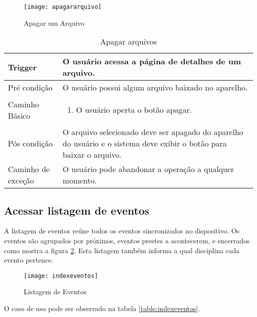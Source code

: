 \begin{figure}[H]
    \centering
\texttt{[image: apagararquivo]}
    \caption{Apagar um Arquivo}
    \label{apagararquivo}
\end{figure}


\begin{table}[H]
  \begin{tabular}{ p{} | p{} }
    Trigger & O usuário acessa a página de detalhes de um arquivo.\\
    \hline
    Pré condição & O usuário possui algum arquivo baixado no aparelho.\\
    \hline
    Caminho Básico &
    \begin{minipage}{5in}
      \vskip 4pt
      \begin{enumerate}
        \item O usuário aperta o botão apagar.
      \end{enumerate}
      \vskip 4pt
    \end{minipage} \\
    \hline
    Pós condição & O arquivo selecionado deve ser apagado do aparelho do usuário e o sistema deve exibir o botão para baixar o arquivo.\\
    \hline
    Caminho de exceção & O usuário pode abandonar a operação a qualquer momento.\\
    \hline
  \end{tabular}
  \caption{Apagar arquivos}
  \label{table:apagararquivo}
\end{table}

\subsection{Acessar listagem de eventos}

A listagem de eventos reúne todos os eventos sincronizados no dispositivo. Os eventos são agrupados por próximos, eventos prestes a acontecerem, e encerrados como mostra a figura \ref{indexeventos}. Esta listagem também informa a qual disciplina cada evento pertence.

\begin{figure}[H]
    \centering
\texttt{[image: indexeventos]}
    \caption{Listagem de Eventos}
    \label{indexeventos}
\end{figure}

O caso de uso pode ser observado na tabela \ref{table:indexeventos}.

